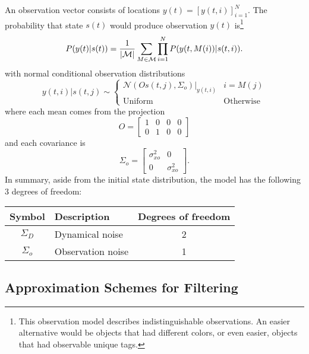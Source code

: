 \documentclass[12pt]{article}
\newcommand{\NormalE}[3]{{\mathcal{N}}\left.\left(#1,#2\right)\right|_{#3}}
\newcommand{\M}{{\cal M}}
\newcommand{\os}[4]{{\left[ #1(#2) \right]}_{#3}^{#4}} %
\newcommand{\ti}[2]{{#1}{(#2)}}                         %
\begin{document}
An observation vector consists of locations
$\ti{y}{t}=\os{y}{t,i}{i=1}{N}$.  The probability that state
$\ti{s}{t}$ would produce observation $\ti{y}{t}$ is\footnote{This
  observation model describes indistinguishable observations.  An
  easier alternative would be objects that had different colors, or
  even easier, objects that had observable unique tags.}
\begin{equation}
  \label{eq:ob}
  P(\ti{y}{t}|\ti{s}{t}) =
    \frac{1}{\left|\M \right|} \sum_{M \in \M}
    \prod_{i=1}^{N} P(\ti{y}{t,M(i)}|\ti{s}{t,i}).
\end{equation}
with normal conditional observation distributions
\begin{equation*}
  \ti{y}{t,i}|\ti{s}{t,j} \sim
  \begin{cases}
    \NormalE{O\ti{s}{t,j}}{\Sigma_o}{\ti{y}{t,i}} & i = M(j) \\
    \text{Uniform} & \text{Otherwise}
  \end{cases}
\end{equation*}
where each mean comes from the projection
\begin{equation*}
  O = \begin{bmatrix} 1 & 0 & 0 & 0\\
    0 & 1 & 0 & 0 \end{bmatrix}
\end{equation*}
and each covariance is
\begin{equation*}
  \Sigma_o = \begin{bmatrix} \sigma_{xo}^2 & 0 \\ 0 &
    \sigma_{xo}^2 \end{bmatrix}.
\end{equation*}
In summary, aside from the initial state distribution, the model has
the following 3 degrees of freedom:
\begin{center}
  \begin{tabular}{|cp{15em}c|}
    \hline
    Symbol & Description & Degrees of freedom \\
    \hline
    $\Sigma_D$ & Dynamical noise & 2 \\
    $\Sigma_o$ & Observation noise & 1 \\
    \hline
  \end{tabular} 
\end{center}

\subsection{Approximation Schemes for Filtering}
\label{sec:approximation.filter}
\end{document}
